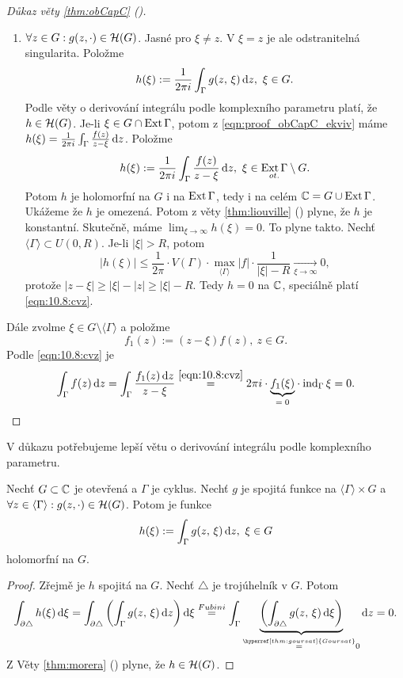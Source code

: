 \begin{proof}[Důkaz věty \cref{thm:obCapC} ()]
\begin{enumerate}[label=(\alph*)]
        \item $\forall z\in G:g(z,\cdot)\in \operatorname{\mathcal{H}}(G)$. Jasné pro $\xi\neq z$. V $\xi=z$ je ale odstranitelná singularita. Položme 
        $$h(\xi):=\frac{1}{2\pi i}\int_\Gamma g(z,\, \xi)\mathop{}\!\mathrm{d} z,\ \xi \in G.$$
        Podle věty o derivování integrálu podle komplexního parametru platí, že $h \in\operatorname{\mathcal{H}}(G)$. Je-li $\xi\in G\cap\operatorname{Ext}\Gamma$, potom z \cref{eqn:proof_obCapC_ekviv} máme $h(\xi)=\frac{1}{2\pi i}\int_\Gamma\frac{f(z)}{z-\xi}\mathop{}\!\mathrm{d} z$. Položme 
        $$h(\xi):=\frac{1}{2\pi i}\int_\Gamma\frac{f(z)}{z-\xi}\mathop{}\!\mathrm{d} z,\ \xi \in \underset{ot.}{\operatorname{Ext}\Gamma}\setminus G.$$
        Potom $h$ je holomorfní na $G$ i na $\operatorname{Ext}\Gamma$, tedy i na celém $\operatorname{\mathbb{C}}=G\cup\operatorname{Ext}\Gamma$. Ukážeme že $h$ je omezená. Potom z věty \cref{thm:liouville} () plyne, že $h$ je konstantní. Skutečně, máme $\lim_{\xi\rightarrow\infty}h(\xi)=0$. To plyne takto.
        Nechť $\langle\Gamma\rangle\subset U(0,R).$ Je-li $|\xi|>R$, potom
        $$|h(\xi)|\leq\frac{1}{2\pi}\cdot V(\Gamma)\cdot\underset{\langle\Gamma\rangle}{\max}|f|\cdot\frac{1}{|\xi|-R}\xrightarrow[\xi\rightarrow\infty]{}0,$$
        protože $|z-\xi|\geq|\xi|-|z|\geq|\xi|-R$. Tedy $h=0$ na $\operatorname{\mathbb{C}}$, speciálně platí \cref{eqn:10.8:cvz}.
    \end{enumerate}
    
    Dále zvolme $\xi\in G\setminus\langle\Gamma\rangle$ a položme 
    $$f_1(z):=(z-\xi)f(z),\ z\in G.$$ 
    Podle \cref{eqn:10.8:cvz} je 
    $$\int_\Gamma f(z)\diff z=\int_\Gamma\frac{f_1(z) \diff z}{z-\xi}
    \stackrel{\cref{eqn:10.8:cvz}}{=}2\pi i \cdot \underset{=\; 0}{\underbrace{f_1(\xi)}}\cdot\ind_\Gamma\xi=0.$$
\end{proof}
V důkazu potřebujeme lepší větu o derivování integrálu podle komplexního parametru.

\begin{theorem}
Nechť $G\subset\operatorname{\mathbb{C}}$ je otevřená a $\Gamma$ je cyklus. Nechť $g$ je spojitá funkce na $\langle\Gamma\rangle\times G$ a $\forall z\in \langle\Gamma\rangle:g(z,\cdot)\in \operatorname{\mathcal{H}}(G)$. Potom je funkce $$h(\xi):=\int_\Gamma g(z,\, \xi)\diff z,\ \xi \in G$$ holomorfní na $G$.
\end{theorem}

\begin{proof}
Zřejmě je $h$ spojitá na $G$. Nechť $\triangle$ je trojúhelník v $G$. Potom $$\int_{\partial\triangle}h(\xi)\diff \xi=\int_{\partial\triangle}\left(\int_\Gamma g(z,\, \xi)\diff z\right)\diff \xi \stackrel{Fubini}{=}\int_\Gamma\underbrace{\left(\int_{\partial\triangle} g(z,\, \xi)\diff \xi \right)}_{\stackrel{\hyperref[thm:goursat]{Goursat}}{=}0}\diff z = 0.$$ 
Z Věty \cref{thm:morera} () plyne, že $h\in\operatorname{\mathcal{H}}(G)$.
\end{proof}

